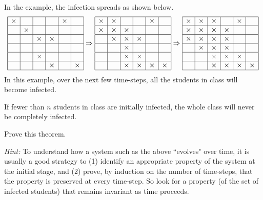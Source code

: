 \documentclass[twoside,12pt]{article}
\begin{document}
\begin{problem}{20}
In the example, the infection spreads as shown below.
%
\[
\begin{array}{|c|c|c|c|c|c|}
\hline
\times& & & &\times& \\ \hline
 &\times& & & & \\ \hline
& &\times&\times& & \\ \hline
& & & & & \\ \hline
& &\times& & & \\ \hline
& & &\times& &\times \\ \hline
\end{array}
\Rightarrow
\begin{array}{|c|c|c|c|c|c|}
\hline
\times&\times& & &\times& \\ \hline
\times&\times&\times& & & \\ \hline
&\times&\times&\times& & \\ \hline
& &\times& & & \\ \hline
& &\times&\times& & \\ \hline
& &\times&\times&\times&\times \\ \hline
\end{array}
\Rightarrow
\begin{array}{|c|c|c|c|c|c|}
\hline
\times&\times&\times& &\times& \\ \hline
\times&\times&\times&\times& & \\ \hline
\times&\times&\times&\times& & \\ \hline
&\times&\times&\times& & \\ \hline
& &\times&\times&\times& \\ \hline
& &\times&\times&\times&\times \\ \hline
\end{array}
\]
%
In this example, over the next few time-steps, all the students in class will become infected.

\begin{theorem*}
If fewer than $n$ students in class are initially infected, the whole class will never be completely infected.
\end{theorem*}

Prove this theorem.

\textit{ Hint:} To understand how a system such as the above ``evolves" over time, it is usually a good strategy to (1) identify an appropriate  property of the system at the initial stage, and (2) prove, by induction on the number of time-steps, that the property is preserved at every time-step. So look for a property (of the set of infected students) that remains invariant as time proceeds.


\end{problem}
\end{document}
